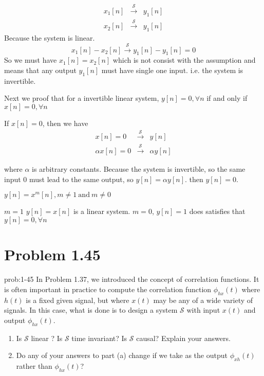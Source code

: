 \documentclass[koma,a4paper,utopia,12pt,listings-color,microtype,paralist,colorlinks,urlcolor=red]{org-article}
\begin{document}
\begin{eqnarray*}
x_{1}[n] &\xrightarrow{\mathcal{S}}& y_{1}[n] \\
x_{2}[n] &\xrightarrow{\mathcal{S}}& y_{1}[n]
\end{eqnarray*}
Because the system is linear.
\begin{equation*}
x_{1}[n] - x_{2}[n] \xrightarrow{\mathcal{S}} y_{1}[n]-y_{1}[n] = 0
\end{equation*}
So we must have \(x_{1}[n] = x_{2}[n]\) which is not consist with the
assumption and means that any output \(y_{1}[n]\) must have single one input.
i.e. the system is invertible.


Next we proof that for a invertible linear system, \(y[n] = 0, \forall n\) if
and only if \(x[n] = 0, \forall n\)

If \(x[n] = 0\), then we have
\begin{eqnarray*}
x[n] = 0 &\xrightarrow{\mathcal{S}} &y[n] \\
\alpha x[n] = 0 &\xrightarrow{\mathcal{S}}&  \alpha y[n]
\end{eqnarray*}

where \(\alpha\) is arbitrary constants. Because the system is invertible, so
the same input \(0\) must lead to the same output, so \(y[n]=\alpha y[n]\).
then \(y[n] = 0\).

\(y[n] = x^{m}[n] , m\neq 1 \ \mathrm{and}\ m\neq 0\)

\(m=1\) \(y[n] = x[n]\) is a linear system.
\(m=0\), \(y[n] = 1\) does satisfies that \(y[n]= 0, \forall n\)
\section{Problem 1.45}
\label{sec:org4477d7c}


\begin{prob}[]{prob:1-45}
In Problem 1.37, we introduced the concept of correlation functions. It is
often important in practice to compute the correlation function
\(\phi_{hx}(t)\) where \(h(t)\) is a fixed given signal, but where \(x(t)\)
may be any of a wide variety of signals. In this case, what is done is to
design a system \(\mathcal{S}\) with input \(x(t)\) and output
\(\phi_{hx}(t)\).

\begin{enumerate}
\item Is \(\mathcal{S}\) linear ? Is \(\mathcal{S}\) time invariant? Is
\(\mathcal{S}\) causal? Explain your answers.
\item Do any of your answers to part (a) change if we take as the output
\(\phi_{xh}(t)\) rather than \(\phi_{hx}(t)\)?
\end{enumerate}
\label{prob:1-45}
\end{prob}
\end{document}
